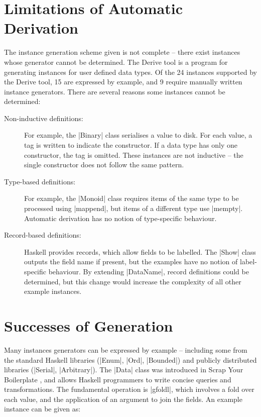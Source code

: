 \documentclass{llncs}
\begin{document}
\section{Limitations of Automatic Derivation}
\label{sec:automatic_failure}

The instance generation scheme given is not complete -- there exist instances whose generator cannot be determined. The Derive tool \cite{derive} is a program for generating instances for user defined data types. Of the 24 instances supported by the Derive tool, 15 are expressed by example, and 9 require manually written instance generators. There are several reasons some instances cannot be determined:

\begin{description}

\item[Non-inductive definitions:] For example, the |Binary| class serialises a value to disk. For each value, a tag is written to indicate the constructor. If a data type has only one constructor, the tag is omitted. These instances are not inductive -- the single constructor does not follow the same pattern.

\item[Type-based definitions:] For example, the |Monoid| class requires items of the same type to be processed using |mappend|, but items of a different type use |mempty|. Automatic derivation has no notion of type-specific behaviour.

\item [Record-based definitions:] Haskell provides records, which allow fields to be labelled. The |Show| class outputs the field name if present, but the examples have no notion of label-specific behaviour. By extending |DataName|, record definitions could be determined, but this change would increase the complexity of all other example instances.

\end{description}

\section{Successes of Generation}
\label{sec:automatic_success}

Many instances generators can be expressed by example -- including some from the standard Haskell libraries (|Enum|, |Ord|, |Bounded|) and publicly distributed libraries (|Serial|, |Arbitrary|). The |Data| class was introduced in Scrap Your Boilerplate \cite{lammel:syb}, and allows Haskell programmers to write concise queries and transformations. The fundamental operation is |gfoldl|, which involves a fold over each value, and the application of an argument to join the fields. An example instance can be given as:
\end{document}
